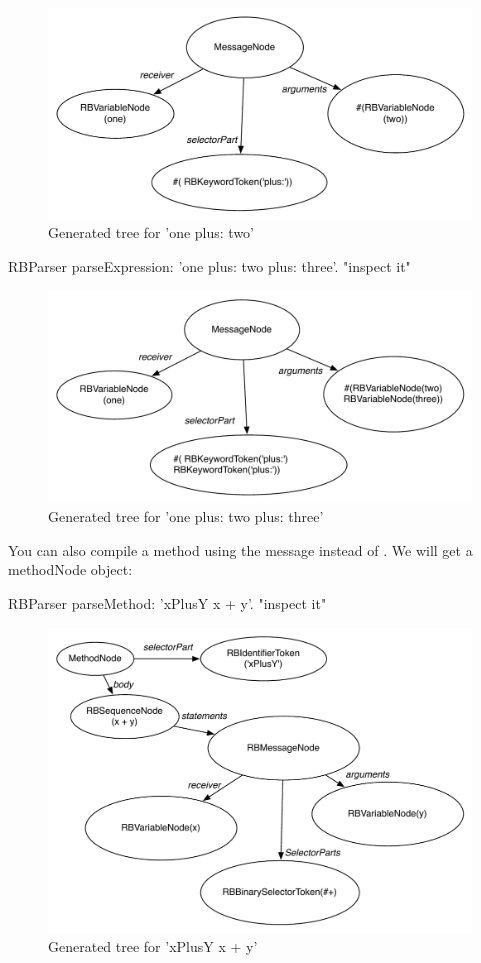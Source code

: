 \documentclass[a4paper,10pt,twoside]{book}
\begin{document}
\begin{figure}[ht]\centering
	\includegraphics[width=0.7\linewidth]{SimpleAtomicExpressionP}
	\caption{Generated tree for  'one plus: two' }
\end{figure}



\begin{code}{}
RBParser parseExpression: 'one plus: two plus: three'.
"inspect it"
\end{code}
\begin{figure}[ht]\centering
	\includegraphics[width=0.7\linewidth]{SimpleMultiExpression}
	\caption{Generated tree for  'one plus: two plus: three' }
\end{figure}

You can also compile a method using the message  instead of . We will get a methodNode object:

\begin{code}{}
RBParser parseMethod: 'xPlusY x + y'.
"inspect it"
\end{code}



\begin{figure}[ht]\centering
	\includegraphics[width=0.7\linewidth]{ASTbeforeSemanticAnalysis}
	\caption{Generated tree for  'xPlusY x + y' }
\end{figure}
\end{document}
